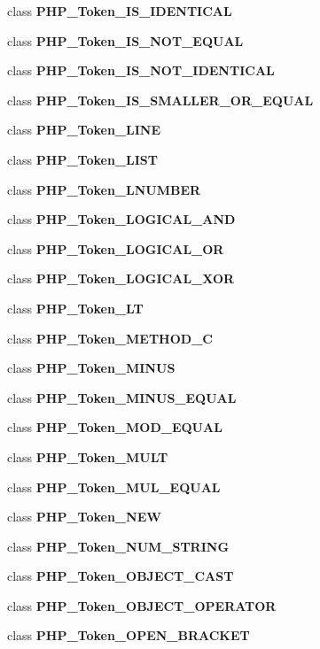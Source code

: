 \begin{DoxyCompactItemize}
\item 
class {\bf P\+H\+P\+\_\+\+Token\+\_\+\+I\+S\+\_\+\+I\+D\+E\+N\+T\+I\+C\+A\+L}
\item 
class {\bf P\+H\+P\+\_\+\+Token\+\_\+\+I\+S\+\_\+\+N\+O\+T\+\_\+\+E\+Q\+U\+A\+L}
\item 
class {\bf P\+H\+P\+\_\+\+Token\+\_\+\+I\+S\+\_\+\+N\+O\+T\+\_\+\+I\+D\+E\+N\+T\+I\+C\+A\+L}
\item 
class {\bf P\+H\+P\+\_\+\+Token\+\_\+\+I\+S\+\_\+\+S\+M\+A\+L\+L\+E\+R\+\_\+\+O\+R\+\_\+\+E\+Q\+U\+A\+L}
\item 
class {\bf P\+H\+P\+\_\+\+Token\+\_\+\+L\+I\+N\+E}
\item 
class {\bf P\+H\+P\+\_\+\+Token\+\_\+\+L\+I\+S\+T}
\item 
class {\bf P\+H\+P\+\_\+\+Token\+\_\+\+L\+N\+U\+M\+B\+E\+R}
\item 
class {\bf P\+H\+P\+\_\+\+Token\+\_\+\+L\+O\+G\+I\+C\+A\+L\+\_\+\+A\+N\+D}
\item 
class {\bf P\+H\+P\+\_\+\+Token\+\_\+\+L\+O\+G\+I\+C\+A\+L\+\_\+\+O\+R}
\item 
class {\bf P\+H\+P\+\_\+\+Token\+\_\+\+L\+O\+G\+I\+C\+A\+L\+\_\+\+X\+O\+R}
\item 
class {\bf P\+H\+P\+\_\+\+Token\+\_\+\+L\+T}
\item 
class {\bf P\+H\+P\+\_\+\+Token\+\_\+\+M\+E\+T\+H\+O\+D\+\_\+\+C}
\item 
class {\bf P\+H\+P\+\_\+\+Token\+\_\+\+M\+I\+N\+U\+S}
\item 
class {\bf P\+H\+P\+\_\+\+Token\+\_\+\+M\+I\+N\+U\+S\+\_\+\+E\+Q\+U\+A\+L}
\item 
class {\bf P\+H\+P\+\_\+\+Token\+\_\+\+M\+O\+D\+\_\+\+E\+Q\+U\+A\+L}
\item 
class {\bf P\+H\+P\+\_\+\+Token\+\_\+\+M\+U\+L\+T}
\item 
class {\bf P\+H\+P\+\_\+\+Token\+\_\+\+M\+U\+L\+\_\+\+E\+Q\+U\+A\+L}
\item 
class {\bf P\+H\+P\+\_\+\+Token\+\_\+\+N\+E\+W}
\item 
class {\bf P\+H\+P\+\_\+\+Token\+\_\+\+N\+U\+M\+\_\+\+S\+T\+R\+I\+N\+G}
\item 
class {\bf P\+H\+P\+\_\+\+Token\+\_\+\+O\+B\+J\+E\+C\+T\+\_\+\+C\+A\+S\+T}
\item 
class {\bf P\+H\+P\+\_\+\+Token\+\_\+\+O\+B\+J\+E\+C\+T\+\_\+\+O\+P\+E\+R\+A\+T\+O\+R}
\item 
class {\bf P\+H\+P\+\_\+\+Token\+\_\+\+O\+P\+E\+N\+\_\+\+B\+R\+A\+C\+K\+E\+T}
\item 

\end{DoxyCompactItemize}
